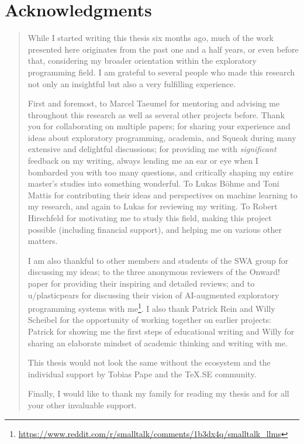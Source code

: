 
\begingroup
\let\raggedsection\centering

\chapter*{Acknowledgments}
\label{cha:acknowledgments}
\endgroup
\begin{quotation}
	\noindent
	While I started writing this thesis six months ago, much of the work presented here originates from the past one and a half years, or even before that, considering my broader orientation within the exploratory programming field.
	I am grateful to several people who made this research not only an insightful but also a very fulfilling experience.

	First and foremost, to Marcel Taeumel for mentoring and advising me throughout this research as well as several other projects before. Thank you for collaborating on multiple papers; for sharing your experience and ideas about exploratory programming, academia, and Squeak during many extensive and delightful discussions; for providing me with \emph{significant} feedback on my writing, always lending me an ear or eye when I bombarded you with too many questions, and critically shaping my entire master's studies into something wonderful.
	To Lukas Böhme and Toni Mattis for contributing their ideas and perspectives on machine learning to my research, and again to Lukas for reviewing my writing.
	To Robert Hirschfeld for motivating me to study this field, making this project possible (including financial support), and helping me on various other matters.

	I am also thankful to other members and students of the SWA group for discussing my ideas; to the three anonymous reviewers of the Onward! paper for providing their inspiring and detailed reviews; and to u/plasticpears for discussing their vision of AI-augmented exploratory programming systems with me\footnote{\url{https://www.reddit.com/r/smalltalk/comments/1b3dx4q/smalltalk_llms}}.
	I also thank Patrick Rein and Willy Scheibel for the opportunity of working together on earlier projects: Patrick for showing me the first steps of educational writing and Willy for sharing an elaborate mindset of academic thinking and writing with me.

	This thesis would not look the same without the ecosystem and the individual support by Tobias Pape and the \TeX.SE community.

	Finally, I would like to thank my family for reading my thesis and for all your other invaluable support.
\end{quotation}
